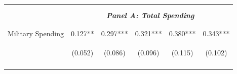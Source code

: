 \documentclass[dv_diss_main.tex]{subfiles}
\begin{document}
\begin{table}[H]
\begin{center}
{\begin{tabular}{lccccc}
    \vspace{-2pt} & \vspace{-2pt} & \vspace{-2pt} & \vspace{-2pt} & \vspace{-2pt} \\\hline
    \vspace{-1.5pt} & \vspace{-1.5pt} & \vspace{-1.5pt} & \vspace{-1.5pt} & \vspace{-1.5pt} \\
    \cmidrule{2-6}
    \vspace{-1.5pt} & \vspace{-1.5pt} & \vspace{-1.5pt} & \vspace{-1.5pt} & \vspace{-1.5pt} \\
    & \multicolumn{5}{c}{\textit{\textbf{Panel A: Total Spending}}} \\ 
    \vspace{-1.5pt} & \vspace{-1.5pt} & \vspace{-1.5pt} & \vspace{-1.5pt} & \vspace{-1.5pt} \\ 
    \cmidrule{2-6}
    \vspace{-1.5pt} & \vspace{-1.5pt} & \vspace{-1.5pt} & \vspace{-1.5pt} & \vspace{-1.5pt}\\
    Military Spending & 0.127** & 0.297*** & 0.321*** & 0.380*** & 0.343*** \\
     & \begin{footnotesize}(0.052)\end{footnotesize} & \begin{footnotesize}(0.086)\end{footnotesize} & \begin{footnotesize}(0.096)\end{footnotesize} & \begin{footnotesize}(0.115)\end{footnotesize} & \begin{footnotesize}(0.102)\end{footnotesize} \\
    \vspace{-1.5pt} & \vspace{-1.5pt} & \vspace{-1.5pt} & \vspace{-1.5pt} & \vspace{-1.5pt} \\
    

\end{tabular}}
\end{center}
\end{table}
\end{document}
